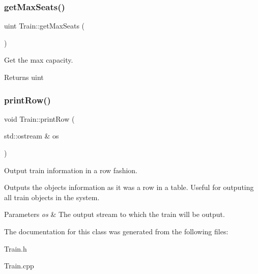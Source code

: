 \subsubsection{\texorpdfstring{get\+Max\+Seats()}{getMaxSeats()}}
{\footnotesize\ttfamily uint Train\+::get\+Max\+Seats (\begin{DoxyParamCaption}{ }\end{DoxyParamCaption})}



Get the max capacity. 

\begin{DoxyReturn}{Returns}
uint 
\end{DoxyReturn}
\mbox{\label{classTrain_a3fd1c87c2152aa96cc6928f0aea37e21}} 
\subsubsection{\texorpdfstring{print\+Row()}{printRow()}}
{\footnotesize\ttfamily void Train\+::print\+Row (\begin{DoxyParamCaption}\item[{std\+::ostream \&}]{os }\end{DoxyParamCaption})}



Output train information in a row fashion. 

Outputs the object\textquotesingle{}s information as it was a row in a table. Useful for outputing all train objects in the system.


\begin{DoxyParams}{Parameters}
{\em os} & The output stream to which the train will be output. \\
\hline
\end{DoxyParams}


The documentation for this class was generated from the following files\+:\begin{DoxyCompactItemize}
\item 
Train.\+h\item 
Train.\+cpp\end{DoxyCompactItemize}
